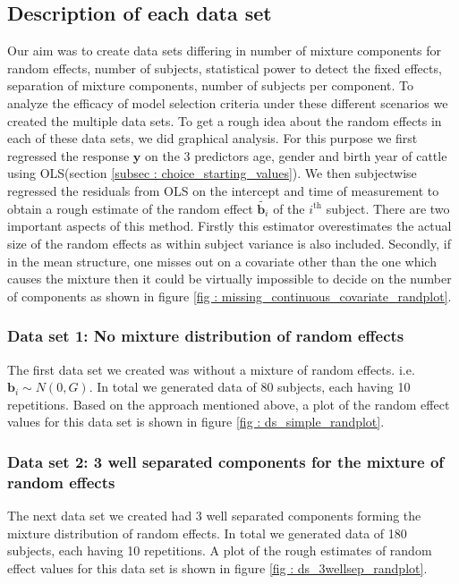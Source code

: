 \subsection{Description of each data set}
\label{subsec : ds_description}
Our aim was to create data sets differing in number of mixture components for random effects, number of subjects, statistical power to detect the fixed effects, separation of mixture components, number of subjects per component. To analyze the efficacy of model selection criteria under these different scenarios we created the multiple data sets. To get a rough idea about the random effects in each of these data sets, we did graphical analysis. For this purpose we first regressed the response $\boldsymbol{y}$ on the 3 predictors age, gender and birth year of cattle using OLS(section \ref{subsec : choice_starting_values}). We then subjectwise regressed the residuals from OLS on the intercept and time of measurement to obtain a rough estimate of the random effect $\tilde{\boldsymbol{b}_i}$ of the $i^\text{th}$ subject. There are two important aspects of this method. Firstly this estimator overestimates the actual size of the random effects as within subject variance is also included. Secondly, if in the mean structure, one misses out on a covariate other than the one which causes the mixture then it could be virtually impossible to decide on the number of components as shown in figure \ref{fig : missing_continuous_covariate_randplot}.

\subsubsection{Data set 1: No mixture distribution of random effects}
\label{subsubsec : ds_simple}
The first data set we created was without a mixture of random effects. i.e. $\boldsymbol{b}_i \sim N(0, G)$. In total we generated data of 80 subjects, each having 10 repetitions. Based on the approach mentioned above, a plot of the random effect values for this data set is shown in figure \ref{fig : ds_simple_randplot}.

\subsubsection{Data set 2: 3 well separated components for the mixture of random effects}
\label{subsubsec : ds_3wellsep}
The next data set we created had 3 well separated components forming the mixture distribution of random effects. In total we generated data of 180 subjects, each having 10 repetitions. A plot of the rough estimates of random effect values for this data set is shown in figure \ref{fig : ds_3wellsep_randplot}.

